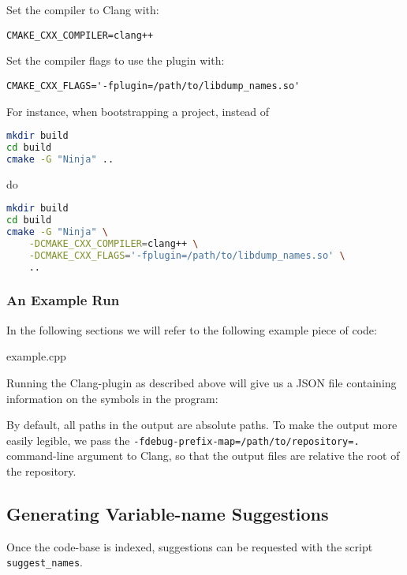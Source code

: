 Set the compiler to Clang with:
\begin{lstlisting}[caption={CMake Compiler Setting}]
CMAKE_CXX_COMPILER=clang++
\end{lstlisting}

Set the compiler flags to use the plugin with:
\begin{lstlisting}[caption={CMake Compiler Arguments}]
CMAKE_CXX_FLAGS='-fplugin=/path/to/libdump_names.so'
\end{lstlisting}

For instance, when bootstrapping a project, instead of
\begin{lstlisting}[caption={CMake Invocation without the Plugin}, language=bash]
mkdir build
cd build
cmake -G "Ninja" ..
\end{lstlisting}
do
\begin{lstlisting}[caption={CMake Invocation with the Plugin}, language=bash]
mkdir build
cd build
cmake -G "Ninja" \
	-DCMAKE_CXX_COMPILER=clang++ \
	-DCMAKE_CXX_FLAGS='-fplugin=/path/to/libdump_names.so' \
	..
\end{lstlisting}

\subsubsection{An Example Run}
In the following sections we will refer to the following example piece of \CC{}
code:


		{example.cpp}

Running the Clang-plugin as described above will give us a JSON file containing
information on the symbols in the program:



By default, all paths in the output are absolute paths. To make the output more
easily legible, we pass the \lstinline|-fdebug-prefix-map=/path/to/repository=.|
command-line argument to Clang, so that the output files are relative the root
of the repository.

\subsection{Generating Variable-name Suggestions}
Once the code-base is indexed, suggestions can be requested with the script
\lstinline|suggest_names|.

